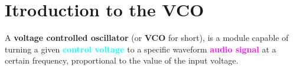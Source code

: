 \chapter{Itroduction to the VCO}

A \textbf{voltage controlled oscillator} (or \textbf{VCO} for short), is a module capable of
turning a given \textbf{\textcolor{cyan}{control voltage}} to a specific waveform
\textbf{\textcolor{magenta}{audio signal}} at a certain frequency, proportional to the
value of the input voltage.

\medskip

\begin{center}
\end{center}
